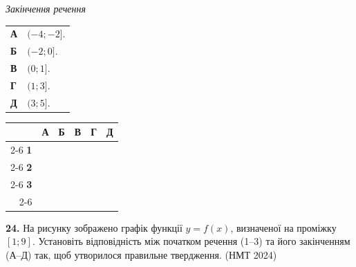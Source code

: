 \documentclass[14pt]{extarticle}
\newcommand{\nmtyear}[1]{\hfill{\small\color{yearcolor}(НМТ #1)}}
\begin{document}
\noindent
\begin{minipage}[t]{0.55\textwidth}
    \textit{Закінчення речення} \par \vspace{0.2cm}
    \begin{tabular}{ll}
    \textbf{А} & $(-4; -2]$. \\
    \textbf{Б} & $(-2; 0]$. \\
    \textbf{В} & $(0; 1]$. \\
    \textbf{Г} & $(1; 3]$. \\
    \textbf{Д} & $(3; 5]$. \\
    \end{tabular}
\end{minipage}%
\hfill
\begin{minipage}[t]{0.40\textwidth}
    \vspace{0.5cm}
    \begin{flushright}
    \begingroup
    \setlength{\tabcolsep}{4pt}
    \renewcommand{\arraystretch}{1.2}
    \small
    \begin{tabular}{r|c|c|c|c|c|}
         \multicolumn{1}{c}{} & \multicolumn{1}{c}{\textbf{А}} & \multicolumn{1}{c}{\textbf{Б}} & \multicolumn{1}{c}{\textbf{В}} & \multicolumn{1}{c}{\textbf{Г}} & \multicolumn{1}{c}{\textbf{Д}} \\ \cline{2-6}
         \textbf{1} & & & & & \\ \cline{2-6}
         \textbf{2} & & & & & \\ \cline{2-6}
         \textbf{3} & & & & & \\ \cline{2-6}
    \end{tabular}
    \endgroup
    \end{flushright}
\end{minipage}

\vspace{0.7cm}

\noindent\textbf{24.} На рисунку зображено графік функції $y=f(x)$, визначеної на проміжку $[1; 9]$. Установіть відповідність між початком речення (1--3) та його закінченням (А--Д) так, щоб утворилося правильне твердження. \nmtyear{2024}

\vspace{0.3cm}
\end{document}

